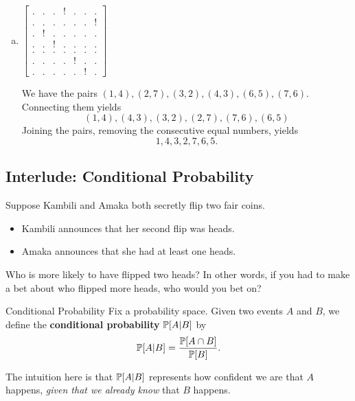 \documentclass[letterpaper]{article}
\newcommand{\0}{\mathbf{0}}
\begin{document}
\begin{mdframed}
\begin{enumerate}[(a)]
        \item $\begin{bmatrix}
            . & . & . & ! & . & . & . \\ 
            . & . & . & . & . & . & ! \\ 
            . & ! & . & . & . & . & . \\ 
            . & . & ! & . & . & . & . \\ 
            . & . & . & . & . & . & . \\ 
            . & . & . & . & ! & . & . \\ 
            . & . & . & . & . & ! & .
        \end{bmatrix}$
        \begin{mdframed}
            We have the pairs $(1, 4), (2, 7), (3, 2), (4, 3), (6, 5), (7, 6)$. Connecting them yields 
            \[(1, 4), (4, 3), (3, 2), (2, 7), (7, 6), (6, 5)\]
            Joining the pairs, removing the consecutive equal numbers, yields 
            \[1, 4, 3, 2, 7, 6, 5.\]
        \end{mdframed}
    \end{enumerate}
\end{mdframed}

\subsection{Interlude: Conditional Probability}
Suppose Kambili and Amaka both secretly flip two fair coins. 
\begin{itemize}
    \item Kambili announces that her second flip was heads. 
    \item Amaka announces that she had at least one heads.
\end{itemize}
Who is more likely to have flipped two heads? In other words, if you had to make a bet about who flipped more heads, who would you bet on? 

\begin{definition}{Conditional Probability}{}
    Fix a probability space. Given two events $A$ and $B$, we define the \textbf{conditional probability} $\mathbb{P}[A | B]$ by 
    \[\mathbb{P}[A | B] = \frac{\mathbb{P}[A \cap B]}{\mathbb{P}[B]}.\]
\end{definition}
The intuition here is that $\mathbb{P}[A | B]$ represents how confident we are that $A$ happens, \emph{given that we already know} that $B$ happens.
\end{document}
